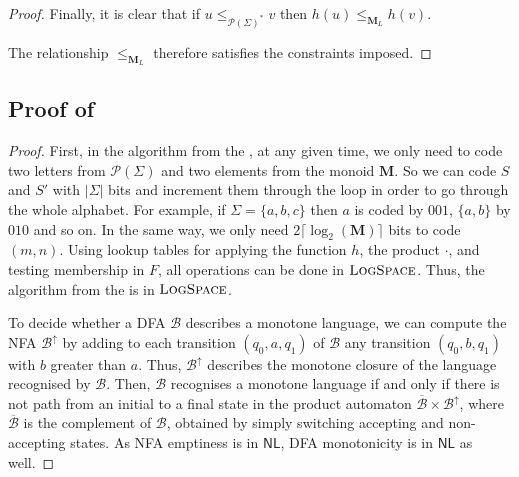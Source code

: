 \documentclass[a4paper,UKenglish,cleveref, autoref, thm-restate]{lipics-v2021}
\renewcommand{\alph}{\part(\Sigma)}
\renewcommand{\part}{\mathcal{P}}
\newcommand{\M}{\mathbf{M}}
\renewcommand{\L}{\textsc{LogSpace}}
\newcommand{\NL}{\mathsf{NL}}
\newcommand{\leqml}{\leq_{\mathbf{M}_L}}
\newcommand{\leqa}{\leq_{\alph^*}}
\newcommand{\aut}{\mathcal{B}}
\begin{document}
\begin{proof}
    Finally, it is clear that if $u\leqa v$ then $h(u)\leqml h(v)$.



    The relationship $\leqml$ therefore satisfies the constraints imposed.
    
\end{proof}








\subsection{\texorpdfstring{Proof of }{Proof of Proposition 32}} \label{ap:proofmon}


\begin{proof}
    First, in the algorithm from the , at any given time, we only need to code two letters from $\alph$ and two elements from the monoid $\M$. 
    So we can code $S$ and $S'$ with $|\Sigma|$ bits and increment them through the loop in order to go through the whole alphabet.
    For example, if $\Sigma = \{a,b,c\}$ then $a$ is coded by $001$, $\{a,b\}$ by $010$ and so on.
    In the same way, we only need $2\lceil\log_2(\M)\rceil$ bits to code $(m,n)$.
    Using lookup tables for applying the function $h$, the product $\cdot$, and testing membership in $F$, all operations can be done in $\L$.
    Thus, the algorithm from the  is in $\L$.

    To decide whether a DFA $\aut$ describes a monotone language, we can compute the NFA $\aut^{\uparrow}$ by adding to each transition $(q_0,a,q_1)$ of $\aut$ any transition $(q_0,b,q_1)$ with $b$ greater than $a$.
    Thus, $\aut^{\uparrow}$ describes the monotone closure of the language recognised by $\aut$.
    Then, $\aut$ recognises a monotone language if and only if there is not path from an initial to a final state in the product automaton $\overline{\aut} \times \aut^{\uparrow}$, where $\overline{\aut}$ is the complement of $\aut$, obtained by simply switching accepting and non-accepting states. 
    As NFA emptiness is in $\NL$, DFA monotonicity is in $\NL$ as well.


\end{proof}
\end{document}
